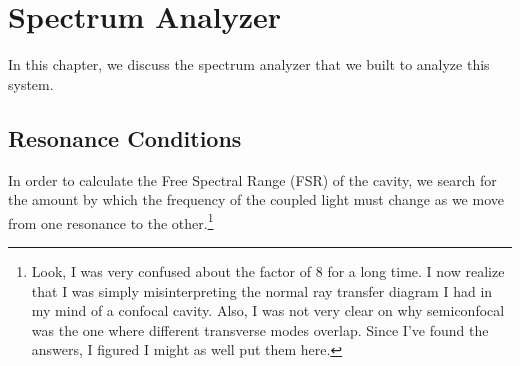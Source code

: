 \chapter{Spectrum Analyzer}






In this chapter, we discuss the spectrum analyzer that we built to analyze this system. 



\section{Resonance Conditions}
In order to calculate the Free Spectral Range (FSR) of the cavity, we search for the amount by which the frequency of the coupled light must change as we move from one resonance to the other.\footnote{Look, I was very confused about the factor of 8 for a long time. I now realize that I was simply misinterpreting the normal ray transfer diagram I had in my mind of a confocal cavity. Also, I was not very clear on why semiconfocal was the one where different transverse modes overlap. Since I've found the answers, I figured I might as well put them here.} 

